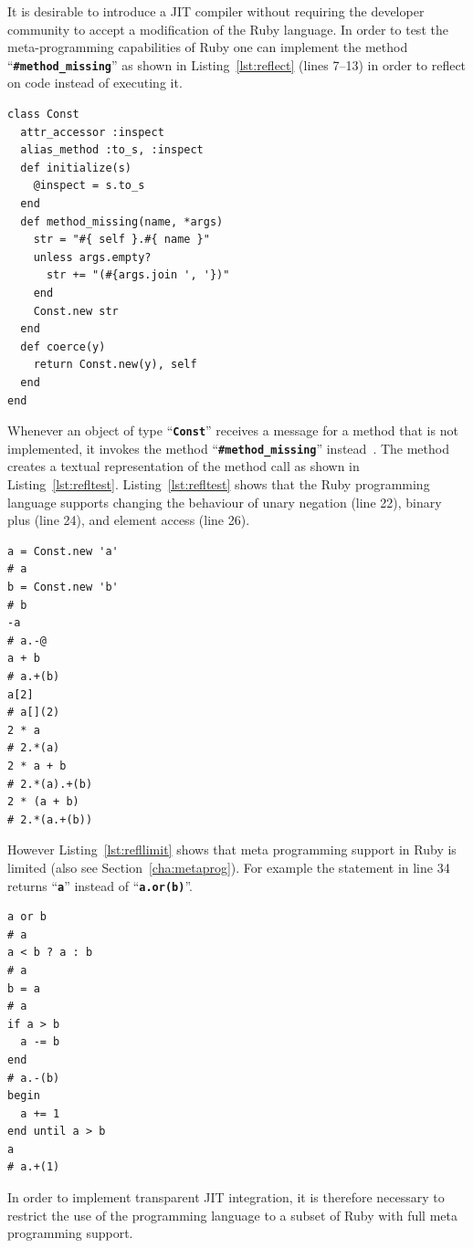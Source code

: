 \documentclass[12pt,a4paper,oneside,openright]{book}
\newcommand{\Eg}{For ex\-am\-ple }
\newcommand{\sct}[1]{Section~\ref{cha:#1}}
\newcommand{\lst}[1]{Listing~\ref{lst:#1}}
\newcommand{\code}[1]{``\texttt{\textbf{\textcolor{codegray}{\small{#1}}}}''}
\begin{document}
\begin{CJK}{UTF8}{}
It is desirable to introduce a \ac{JIT} compiler without requiring the developer community to accept a modification of the Ruby language. In order to test the meta-programming capabilities of Ruby one can implement the method \code{\#method\_missing} as shown in \lst{reflect} (lines 7--13) in order to reflect on code instead of executing it.
\lstset{language=Ruby,frame=single,numbers=left}
\begin{lstlisting}[float=htbp,caption={Reflection using missing methods},escapechar=\$,label=lst:reflect,name=reflect]
class Const
  attr_accessor :inspect
  alias_method :to_s, :inspect
  def initialize(s)
    @inspect = s.to_s
  end
  def method_missing(name, *args)
    str = "#{ self }.#{ name }"
    unless args.empty?
      str += "(#{args.join ', '})"
    end
    Const.new str
  end
  def coerce(y)
    return Const.new(y), self
  end
end
\end{lstlisting}
Whenever an object of type \code{Const} receives a message for a method that is not implemented, it invokes the method \code{\#method\_missing} instead~\citep{RefWorks:541}. The method creates a textual representation of the method call as shown in \lst{refltest}. \lst{refltest} shows that the Ruby programming language supports changing the behaviour of unary negation (line 22), binary plus (line 24), and element access (line 26).
\lstset{language=Ruby,frame=single,numbers=left}
\begin{lstlisting}[float=htbp,caption={Example applying reflection to simple operations},escapechar=\$,label=lst:refltest,name=reflect]
a = Const.new 'a'
# a
b = Const.new 'b'
# b
-a
# a.-@
a + b
# a.+(b)
a[2]
# a[](2)
2 * a
# 2.*(a)
2 * a + b
# 2.*(a).+(b)
2 * (a + b)
# 2.*(a.+(b))
\end{lstlisting}

However \lst{refllimit} shows that meta programming support in Ruby is limited (also see \sct{metaprog}). \Eg the statement in line 34 returns \code{a} instead of \code{a.or(b)}.
\lstset{language=Ruby,frame=single,numbers=left}
\begin{lstlisting}[float=htbp,caption={Limitations of reflection in Ruby},escapechar=\$,label=lst:refllimit,name=reflect]
a or b
# a
a < b ? a : b
# a
b = a
# a
if a > b
  a -= b
end
# a.-(b)
begin
  a += 1
end until a > b
a
# a.+(1)
\end{lstlisting}
In order to implement transparent \ac{JIT} integration, it is therefore necessary to restrict the use of the programming language to a subset of Ruby with full meta programming support.


\end{CJK}
\end{document}
